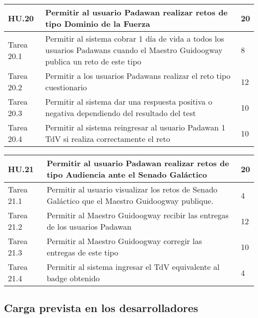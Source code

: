 \begin{table}[h]
	\centering
	\begin{tabular}{| p{2.3cm} | p{6.7cm} | p{2cm} |}
		\rowcolor[HTML]{329A9D} 
		{\color[HTML]{FFFFFF} \textbf{HU.20}} & {\color[HTML]{FFFFFF} \textbf{Permitir al usuario Padawan realizar retos de tipo Dominio de la Fuerza}} & {\color[HTML]{FFFFFF} \textbf{20}}  \\ \hline
		Tarea 20.1 & Permitir al sistema cobrar 1 día de vida a todos los usuarios Padawans cuando el Maestro Guidoogway publica un reto de este tipo & 8 \\ \hline
		Tarea 20.2 & Permitir a los usuarios Padawans realizar el reto tipo cuestionario & 12 \\ \hline
		Tarea 20.3 & Permitir al sistema dar una respuesta positiva o negativa dependiendo del resultado del test & 10 \\ \hline
		Tarea 20.4 & Permitir al sistema reingresar al usuario Padawan 1 TdV si realiza correctamente el reto & 10 \\ \hline
	\end{tabular}
\end{table}

\begin{table}[h]
	\centering
	\begin{tabular}{| p{2.3cm} | p{6.7cm} | p{2cm} |}
		\rowcolor[HTML]{329A9D} 
		{\color[HTML]{FFFFFF} \textbf{HU.21}} & {\color[HTML]{FFFFFF} \textbf{Permitir al usuario Padawan realizar retos de tipo Audiencia ante el Senado Galáctico}} & {\color[HTML]{FFFFFF} \textbf{20}}  \\ \hline
		Tarea 21.1 & Permitir al usuario visualizar los retos de Senado Galáctico que el Maestro Guidoogway publique. & 4 \\ \hline
		Tarea 21.2 & Permitir al Maestro Guidoogway recibir las entregas de los usuarios Padawan & 12 \\ \hline
		Tarea 21.3 & Permitir al Maestro Guidoogway corregir las entregas de este tipo & 10 \\ \hline
		Tarea 21.4 & Permitir al sistema ingresar el TdV equivalente al badge obtenido & 4 \\ \hline
	\end{tabular}
\end{table}

\subsection{Carga prevista en los desarrolladores}

